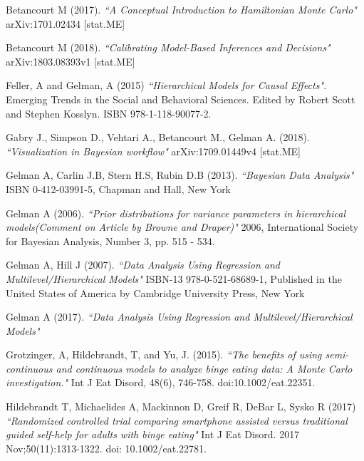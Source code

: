 \documentclass{article}
\begin{document}
\begin{thebibliography}{9}

Betancourt M (2017).
\textit{``A Conceptual Introduction to Hamiltonian Monte Carlo"} 
arXiv:1701.02434 [stat.ME]

Betancourt M (2018).
\textit{``Calibrating Model-Based Inferences and Decisions"} 
arXiv:1803.08393v1 [stat.ME]

Feller, A and Gelman, A (2015) \textit{``Hierarchical Models for Causal Effects".}
Emerging Trends in the Social and Behavioral Sciences. Edited by Robert Scott and Stephen Kosslyn. ISBN 978-1-118-90077-2.

Gabry J., Simpson D., Vehtari A., Betancourt M., Gelman A. (2018).
\textit{``Visualization in Bayesian workflow"} 
arXiv:1709.01449v4 [stat.ME]

Gelman A, Carlin J.B, Stern H.S, Rubin D.B (2013).
\textit{``Bayesian Data Analysis"}
ISBN 0-412-03991-5, Chapman and Hall, New York

Gelman A (2006).
\textit{``Prior distributions for variance parameters in hierarchical models(Comment on Article by Browne and Draper)"}
2006, International Society for Bayesian Analysis, Number 3, pp. 515 - 534.

Gelman A, Hill J (2007).
\textit{``Data Analysis Using Regression and Multilevel/Hierarchical Models"}
ISBN-13 978-0-521-68689-1, Published in the United States of America by Cambridge University Press, New York

Gelman A (2017).
\textit{``Data Analysis Using Regression and Multilevel/Hierarchical Models"}

Grotzinger, A, Hildebrandt, T, and Yu, J. (2015). 
\textit{``The benefits of using semi-continuous and continuous models to analyze binge eating data: A Monte Carlo investigation."}
 Int J Eat Disord, 48(6), 746-758. doi:10.1002/eat.22351.
 
Hildebrandt T, Michaelides A, Mackinnon D, Greif R, DeBar L, Sysko R (2017)
\textit{``Randomized controlled trial comparing smartphone assisted
versus traditional guided self-help for adults with binge eating"}
Int J Eat Disord. 2017 Nov;50(11):1313-1322. doi: 10.1002/eat.22781.


\end{thebibliography}
\end{document}
